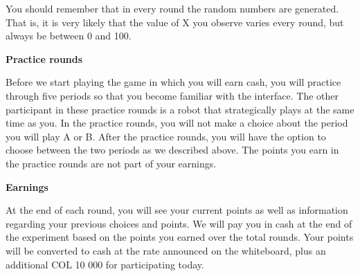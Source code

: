 \documentclass[12pt,english]{article}
\begin{document}
You should remember that in every round the random numbers are generated. That is, it is very likely that the value of X you observe varies every round, but always be between 0 and 100. 

\noindent \textbf{Practice rounds}

Before we start playing the game in which you will earn cash, you will practice through five periods so that you become familiar with the interface. The other participant in these practice rounds is a robot that strategically plays at the same time as you. In the practice rounds, you will not make a choice about the period you will play A or B. After the practice rounds, you will have the option to choose between the two periods as we described above. The points you earn in the practice rounds are not part of your earnings.


\noindent \textbf{Earnings}

At the end of each round, you will see your current points as well as information regarding your previous choices and points.  We will pay you in cash at the end of the experiment based on the points you earned over the total rounds. Your points will be converted to cash at the rate announced on the whiteboard, plus an additional COL 10 000 for participating today. 
\end{document}

